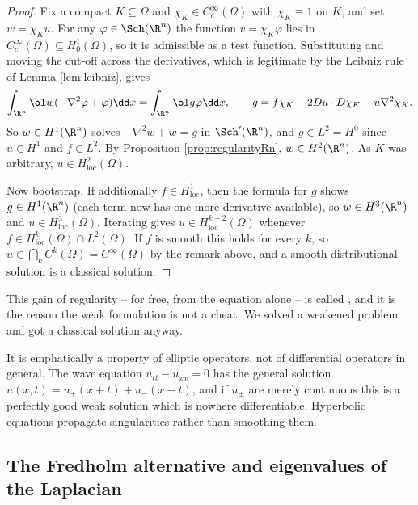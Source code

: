 \begin{proof}
	Fix a compact $K\subseteq\Omega$ and $\chi_K\in C_c^\infty(\Omega)$ with $\chi_K\equiv1$ on $K$, and set $w = \chi_Ku$. For any $\varphi\in\Sch(\R^n)$ the function $v = \chi_K\varphi$ lies in $C_c^\infty(\Omega)\subseteq H_0^1(\Omega)$, so it is admissible as a test function. Substituting and moving the cut-off across the derivatives, which is legitimate by the Leibniz rule of Lemma \ref{lem:leibniz}, gives
	$$\int_{\R^n}\ol w(-\nabla^2\varphi+\varphi)\dd x = \int_{\R^n}\ol g\varphi\dd x, \qquad g = f\chi_K - 2Du\cdot D\chi_K-u\nabla^2\chi_K.$$
	So $w \in H^1(\R^n)$ solves $-\nabla^2w+w=g$ in $\Sch'(\R^n)$, and $g \in L^2 = H^0$ since $u \in H^1$ and $f \in L^2$. By Proposition \ref{prop:regularityRn}, $w \in H^2(\R^n)$. As $K$ was arbitrary, $u \in H^2_{\mathrm{loc}}(\Omega)$.

	Now bootstrap. If additionally $f \in H^1_{\mathrm{loc}}$, then the formula for $g$ shows $g\in H^1(\R^n)$ (each term now has one more derivative available), so $w \in H^3(\R^n)$ and $u\in H^3_{\mathrm{loc}}(\Omega)$. Iterating gives $u \in H^{k+2}_{\mathrm{loc}}(\Omega)$ whenever $f\in H^k_{\mathrm{loc}}(\Omega)\cap L^2(\Omega)$. If $f$ is smooth this holds for every $k$, so $u \in \bigcap_kC^k(\Omega)=C^\infty(\Omega)$ by the remark above, and a smooth distributional solution is a classical solution.
\end{proof}

This gain of regularity -- for free, from the equation alone -- is called , and it is the reason the weak formulation is not a cheat. We solved a weakened problem and got a classical solution anyway.

\begin{remark}
	It is emphatically a property of elliptic operators, not of differential operators in general. The wave equation $u_{tt}-u_{xx}=0$ has the general solution $u(x,t)=u_+(x+t)+u_-(x-t)$, and if $u_\pm$ are merely continuous this is a perfectly good weak solution which is nowhere differentiable. Hyperbolic equations propagate singularities rather than smoothing them.
\end{remark}

\subsection{The Fredholm alternative and eigenvalues of the Laplacian}

